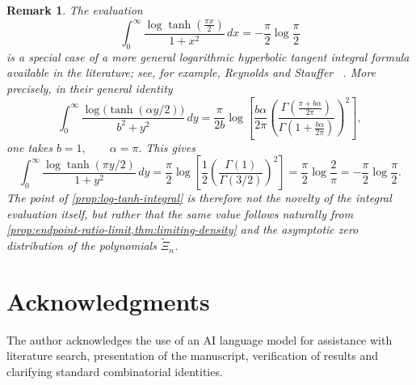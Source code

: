 \documentclass[11pt,twoside]{article}
\newtheorem{remark}[theorem]{Remark}
\numberwithin{equation}{section}
\begin{document}
\begin{remark}
The evaluation
\[
\int_{0}^{\infty}\frac{\log \tanh\!\left(\frac{\pi x}{2}\right)}{1+x^{2}}\,dx
=
-\frac{\pi}{2}\log\!\frac{\pi}{2}
\]
is a special case of a more general logarithmic hyperbolic tangent integral formula available in the literature; see, for example, Reynolds and Stauffer~ \textnormal{\cite{ReynoldsStauffer2020}}. More precisely, in their general identity
\[
\int_0^\infty \frac{\log\!\bigl(\tanh(\alpha y/2)\bigr)}{b^2+y^2}\,dy
=
\frac{\pi}{2b}\log\!\left[
\frac{b\alpha}{2\pi}
\left(
\frac{\Gamma\!\left(\frac{\pi+b\alpha}{2\pi}\right)}
{\Gamma\!\left(1+\frac{b\alpha}{2\pi}\right)}
\right)^2
\right],
\]
one takes
\(
b=1,
\qquad
\alpha=\pi.
\) This gives
\[
\int_0^\infty \frac{\log \tanh(\pi y/2)}{1+y^2}\,dy
=
\frac{\pi}{2}\log\!\left[
\frac12
\left(\frac{\Gamma(1)}{\Gamma(3/2)}\right)^2
\right]
=
\frac{\pi}{2}\log\!\frac{2}{\pi}
=
-\frac{\pi}{2}\log\!\frac{\pi}{2}.
\]
The point of \cref{prop:log-tanh-integral} is therefore not the novelty of the integral evaluation itself, but rather that the same value follows naturally from \cref{prop:endpoint-ratio-limit,thm:limiting-density} and the asymptotic zero distribution of the polynomials \(\widetilde{\Xi}_n\).
\end{remark}

\section*{Acknowledgments}
The author acknowledges the use of an AI language model for assistance with literature search, presentation of the manuscript, verification of results and clarifying standard combinatorial identities.

\printbibliography
\end{document}
